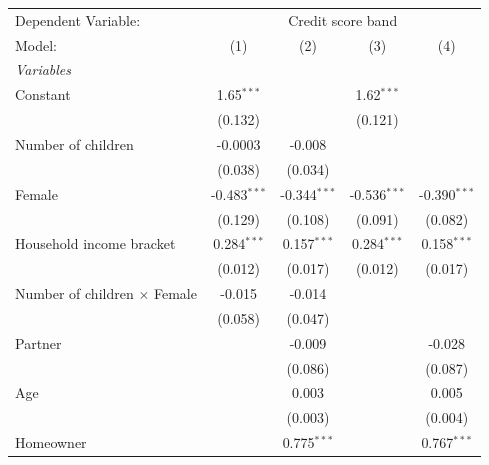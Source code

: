 
\begingroup
\centering
\begin{tabular}{lcccc}
   \tabularnewline \midrule \midrule
   Dependent Variable: & \multicolumn{4}{c}{Credit score band}\\
   Model:                              & (1)            & (2)            & (3)            & (4)\\  
   \midrule
   \emph{Variables}\\
   Constant                            & 1.65$^{***}$   &                & 1.62$^{***}$   &   \\   
                                       & (0.132)        &                & (0.121)        &   \\   
   Number of children                  & -0.0003        & -0.008         &                &   \\   
                                       & (0.038)        & (0.034)        &                &   \\   
   Female                              & -0.483$^{***}$ & -0.344$^{***}$ & -0.536$^{***}$ & -0.390$^{***}$\\   
                                       & (0.129)        & (0.108)        & (0.091)        & (0.082)\\   
   Household income bracket            & 0.284$^{***}$  & 0.157$^{***}$  & 0.284$^{***}$  & 0.158$^{***}$\\   
                                       & (0.012)        & (0.017)        & (0.012)        & (0.017)\\   
   Number of children $\times$ Female  & -0.015         & -0.014         &                &   \\   
                                       & (0.058)        & (0.047)        &                &   \\   
   Partner                             &                & -0.009         &                & -0.028\\   
                                       &                & (0.086)        &                & (0.087)\\   
   Age                                 &                & 0.003          &                & 0.005\\   
                                       &                & (0.003)        &                & (0.004)\\   
   Homeowner                           &                & 0.775$^{***}$  &                & 0.767$^{***}$\\   

\end{tabular}
